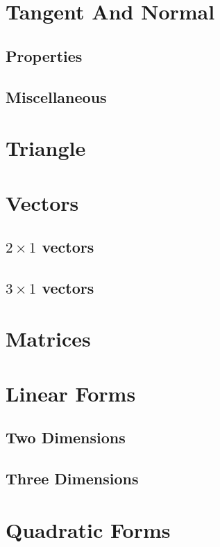 \documentclass[11pt]{book}
\begin{document}
\chapter{Tangent And Normal}
\section{Properties}
\section{Miscellaneous}

\chapter{Triangle }
\fi

% 
\backmatter
\appendix
\iffalse
\chapter{ Vectors}
\section{$2\times 1$ vectors}
%
\section{$3\times 1$ vectors}
\chapter{Matrices}

\chapter{Linear Forms}
\section{Two Dimensions}
\section{Three Dimensions}
\chapter{Quadratic Forms}
\end{document}
